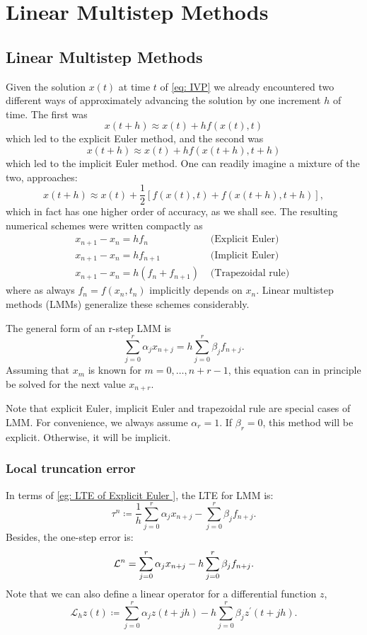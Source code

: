 \part{Linear Multistep Methods}
\chapter{Linear Multistep Methods}
 

Given the solution $x(t)$ at time $t$ of \eqref{eq: IVP} we already encountered two different ways of approximately advancing the solution by one increment $h$ of time. The first was
$$
x(t+h) \approx x(t)+h f(x(t), t)
$$
which led to the explicit Euler method, and the second was
$$
x(t+h) \approx x(t)+h f(x(t+h), t+h)
$$
which led to the implicit Euler method.
One can readily imagine a mixture of the two, approaches:
$$
x(t+h) \approx x(t)+\frac{1}{2}[f(x(t), t)+f(x(t+h), t+h)],
$$
which in fact has one higher order of accuracy, as we shall see.
The resulting numerical schemes were written compactly as
$$
\begin{array}{lr}
x_{n+1}-x_n=h f_n & \text { (Explicit Euler) } \\
x_{n+1}-x_n=h f_{n+1} & \text { (Implicit Euler) } \\
x_{n+1}-x_n=h\left(f_n+f_{n+1}\right) & \text { (Trapezoidal rule) }
\end{array}
$$
where as always $f_n=f\left(x_n, t_n\right)$ implicitly depends on $x_n$. Linear multistep methods (LMMs) generalize these schemes considerably. 
\begin{definition}
\label{def: Linear multistep methods}
The general form of an r-step LMM is
\begin{equation}
\label{eq: LMM}
    \sum_{j=0}^r \alpha_j x_{n+j}=h \sum_{j=0}^r \beta_j f_{n+j} .
\end{equation}
Assuming that $x_m$ is known for $m=0, \ldots, n+r-1$, this equation can in principle be solved for the next value $x_{n+r}$.
\end{definition}
Note that explicit Euler, implicit Euler and trapezoidal rule are special cases of LMM. For convenience, we always assume $ \alpha _r =1$. If $ \beta_r=0 $, this method will be explicit. Otherwise, it will be implicit.  

\section{Local truncation error} 
In terms of \autoref{eg: LTE of Explicit Euler }, the LTE for LMM is: 
\[
    \tau^n \coloneqq \frac{1}{h} \sum_{j=0}^{r}  \alpha _j x_{n+j} - \sum_{j=0}^{r} \beta _j f_{n+j}.   
\] 
Besides, the one-step error is: 
\[
    \mathcal{L}^{n} =\sum_{j=0}^{r}  \alpha _j x_{n+j} - h\sum_{j=0}^{r} \beta _j f_{n+j}. 
\]
Note that we can also define a linear operator for a differential function $ z $, 
\begin{equation}
\label{eq: linear operator as one-step error }
        \mathscr{L}_h z(t) \coloneqq  \sum_{j=0}^r \alpha_j z(t+j h)-h \sum_{j=0}^r \beta_j z^{\prime}(t+j h) .
\end{equation}



